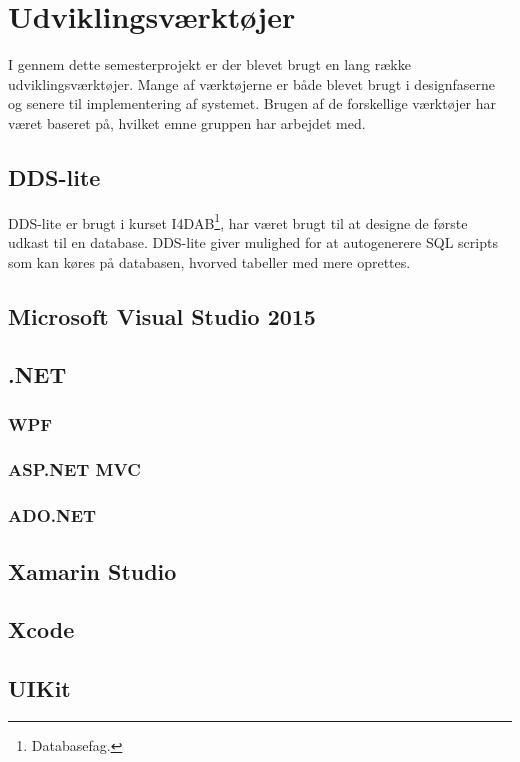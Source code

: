 \chapter{Udviklingsværktøjer}

I gennem dette semesterprojekt er der blevet brugt en lang række udviklingsværktøjer. Mange af værktøjerne er både blevet brugt i designfaserne og senere til implementering af systemet. Brugen af de forskellige værktøjer har været baseret på, hvilket emne gruppen har arbejdet med.

\section*{DDS-lite}
DDS-lite er brugt i kurset I4DAB\footnote{Databasefag.}, har været brugt til at designe de første udkast til en database. DDS-lite giver mulighed for at autogenerere SQL scripts som kan køres på databasen, hvorved tabeller med mere oprettes.

\section*{Microsoft Visual Studio 2015}
\section{.NET}

\subsection{WPF}

\subsection{ASP.NET MVC}

\subsection{ADO.NET}

\section{Xamarin Studio}

\section{Xcode}

\section{UIKit}

